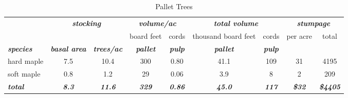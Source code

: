 \documentclass[landscape]{article}
\begin{document}
\begin{table}[H]

\caption{\label{tab:unnamed-chunk-20}Pallet Trees}
\fontsize{10}{12}\selectfont
\begin{tabular}[t]{lcccccccc}
\toprule
\multicolumn{1}{c}{\em{\textbf{ }}} & \multicolumn{2}{c}{\em{\textbf{stocking}}} & \multicolumn{2}{c}{\em{\textbf{volume/ac }}} & \multicolumn{2}{c}{\em{\textbf{total volume}}} & \multicolumn{2}{c}{\em{\textbf{stumpage}}} \\
\cmidrule(l{3pt}r{3pt}){2-3} \cmidrule(l{3pt}r{3pt}){4-5} \cmidrule(l{3pt}r{3pt}){6-7} \cmidrule(l{3pt}r{3pt}){8-9}
\multicolumn{3}{c}{ } & \multicolumn{1}{c}{board feet} & \multicolumn{1}{c}{cords} & \multicolumn{1}{c}{thousand board feet} & \multicolumn{1}{c}{cords} & \multicolumn{1}{c}{per acre} & \multicolumn{1}{c}{total} \\
\cmidrule(l{3pt}r{3pt}){4-4} \cmidrule(l{3pt}r{3pt}){5-5} \cmidrule(l{3pt}r{3pt}){6-6} \cmidrule(l{3pt}r{3pt}){7-7} \cmidrule(l{3pt}r{3pt}){8-8} \cmidrule(l{3pt}r{3pt}){9-9}
\rowcolor[HTML]{DCDCDC}  \em{\textbf{species}} & \em{\textbf{basal area}} & \em{\textbf{trees/ac}} & \em{\textbf{pallet}} & \em{\textbf{pulp}} & \em{\textbf{pallet}} & \em{\textbf{pulp}} & \em{\textbf{ }} & \em{\textbf{ }}\\
\midrule
\rowcolor{gray!6}  hard maple & 7.5 & 10.4 & 300 & 0.80 & 41.1 & 109 & 31 & 4195\\
 
soft maple & 0.8 & 1.2 & 29 & 0.06 & 3.9 & 8 & 2 & 209\\
 
\rowcolor{gray!6}  \rowcolor[HTML]{DCDCDC}  \em{\textbf{total}} & \em{\textbf{8.3}} & \em{\textbf{11.6}} & \em{\textbf{329}} & \em{\textbf{0.86}} & \em{\textbf{45.0}} & \em{\textbf{117}} & \em{\textbf{\$32}} & \em{\textbf{\$4405}}\\
\bottomrule
\end{tabular}
\end{table}
\end{document}
